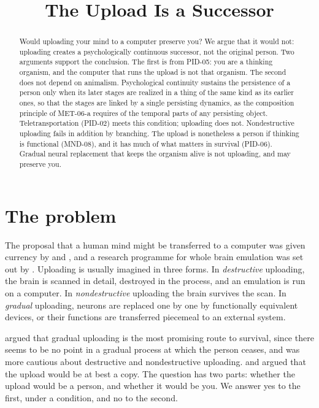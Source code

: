 \documentclass{situationist-preprint}
\title{The Upload Is a Successor}
\begin{document}
\maketitle

\begin{abstract}
Would uploading your mind to a computer preserve you? We argue that it would not: uploading creates a psychologically continuous successor, not the original person. Two arguments support the conclusion. The first is from PID-05: you are a thinking organism, and the computer that runs the upload is not that organism. The second does not depend on animalism. Psychological continuity sustains the persistence of a person only when its later stages are realized in a thing of the same kind as its earlier ones, so that the stages are linked by a single persisting dynamics, as the composition principle of MET-06-a requires of the temporal parts of any persisting object. Teletransportation (PID-02) meets this condition; uploading does not. Nondestructive uploading fails in addition by branching. The upload is nonetheless a person if thinking is functional (MND-08), and it has much of what matters in survival (PID-06). Gradual neural replacement that keeps the organism alive is not uploading, and may preserve you.
\end{abstract}

\section{The problem}

The proposal that a human mind might be transferred to a computer was given currency by \citet{Moravec1988} and \citet{Kurzweil2005}, and a research programme for whole brain emulation was set out by \citet{SandbergBostrom2008}. Uploading is usually imagined in three forms. In \emph{destructive} uploading, the brain is scanned in detail, destroyed in the process, and an emulation is run on a computer. In \emph{nondestructive} uploading the brain survives the scan. In \emph{gradual} uploading, neurons are replaced one by one by functionally equivalent devices, or their functions are transferred piecemeal to an external system.

\citet{Chalmers2010} argued that gradual uploading is the most promising route to survival, since there seems to be no point in a gradual process at which the person ceases, and was more cautious about destructive and nondestructive uploading. \citet{CorabiSchneider2012} and \citet{Schneider2019} argued that the upload would be at best a copy. The question has two parts: whether the upload would be a person, and whether it would be you. We answer yes to the first, under a condition, and no to the second.
\end{document}
